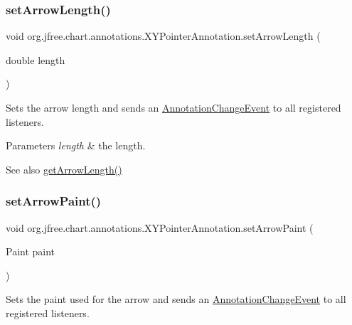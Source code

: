 \subsubsection{\texorpdfstring{set\+Arrow\+Length()}{setArrowLength()}}
{\footnotesize\ttfamily void org.\+jfree.\+chart.\+annotations.\+X\+Y\+Pointer\+Annotation.\+set\+Arrow\+Length (\begin{DoxyParamCaption}\item[{double}]{length }\end{DoxyParamCaption})}

Sets the arrow length and sends an \mbox{\hyperlink{}{Annotation\+Change\+Event}} to all registered listeners.


\begin{DoxyParams}{Parameters}
{\em length} & the length.\\
\hline
\end{DoxyParams}
\begin{DoxySeeAlso}{See also}
\mbox{\hyperlink{classorg_1_1jfree_1_1chart_1_1annotations_1_1_x_y_pointer_annotation_acd4f8668892f3f126915d73efd70135b}{get\+Arrow\+Length()}} 
\end{DoxySeeAlso}
\mbox{\label{classorg_1_1jfree_1_1chart_1_1annotations_1_1_x_y_pointer_annotation_a7d50d7097cce8e312281b10f20fcf561}} 
\subsubsection{\texorpdfstring{set\+Arrow\+Paint()}{setArrowPaint()}}
{\footnotesize\ttfamily void org.\+jfree.\+chart.\+annotations.\+X\+Y\+Pointer\+Annotation.\+set\+Arrow\+Paint (\begin{DoxyParamCaption}\item[{Paint}]{paint }\end{DoxyParamCaption})}

Sets the paint used for the arrow and sends an \mbox{\hyperlink{}{Annotation\+Change\+Event}} to all registered listeners.


